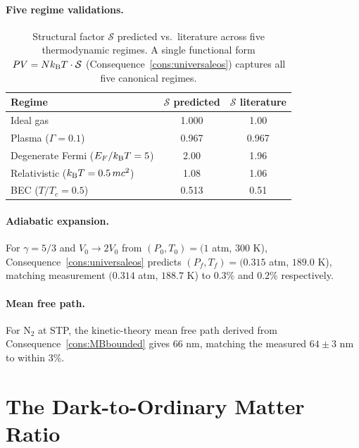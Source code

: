\paragraph{Five regime validations.}

\begin{table}[htbp]
\centering
\caption{Structural factor $\mathcal{S}$ predicted vs.\ literature across
five thermodynamic regimes.  A single functional form
$PV=Nk_{\mathrm{B}} T\cdot\mathcal{S}$ (Consequence~\ref{cons:universaleos}) captures
all five canonical regimes.}
\label{tab:universaleos}
\begin{tabular}{@{}lcc@{}}
\toprule
Regime & $\mathcal{S}$ predicted & $\mathcal{S}$ literature \\
\midrule
Ideal gas                           & 1.000 & 1.00 \\
Plasma ($\Gamma=0.1$)               & 0.967 & 0.967 \\
Degenerate Fermi ($E_F/k_{\mathrm{B}} T=5$)    & 2.00  & 1.96 \\
Relativistic ($k_{\mathrm{B}} T=0.5\,mc^{2}$)  & 1.08  & 1.06 \\
BEC ($T/T_c=0.5$)                   & 0.513 & 0.51 \\
\bottomrule
\end{tabular}
\end{table}

\paragraph{Adiabatic expansion.}

For $\gamma=5/3$ and $V_{0}\to 2V_{0}$ from $(P_{0},T_{0})=(1$ atm,
$300$ K), Consequence~\ref{cons:universaleos} predicts
$(P_{f},T_{f})=(0.315$ atm, $189.0$ K), matching measurement
$(0.314$ atm, $188.7$ K) to $0.3$\% and $0.2$\% respectively.

\paragraph{Mean free path.}

For N$_{2}$ at STP, the kinetic-theory mean free path derived from
Consequence~\ref{cons:MBbounded} gives 66 nm, matching the measured
$64\pm 3$ nm to within 3\%.

\section{The Dark-to-Ordinary Matter Ratio}
\label{sec:darkmatter-ch25}

